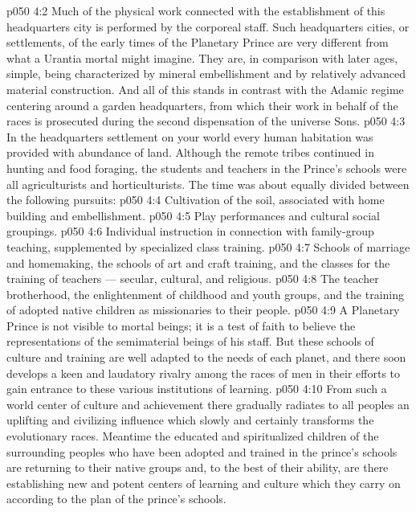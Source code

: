 \vs p050 4:2 Much of the physical work connected with the establishment of this headquarters city is performed by the corporeal staff. Such headquarters cities, or settlements, of the early times of the Planetary Prince are very different from what a Urantia mortal might imagine. They are, in comparison with later ages, simple, being characterized by mineral embellishment and by relatively advanced material construction. And all of this stands in contrast with the Adamic regime centering around a garden headquarters, from which their work in behalf of the races is prosecuted during the second dispensation of the universe Sons.
\vs p050 4:3 \pc In the headquarters settlement on your world every human habitation was provided with abundance of land. Although the remote tribes continued in hunting and food foraging, the students and teachers in the Prince’s schools were all agriculturists and horticulturists. The time was about equally divided between the following pursuits:
\vs p050 4:4 \bibnobreakspace {} Cultivation of the soil, associated with home building and embellishment.
\vs p050 4:5 \bibnobreakspace {} Play performances and cultural social groupings.
\vs p050 4:6 \bibnobreakspace {} Individual instruction in connection with family\hyp{}group teaching, supplemented by specialized class training.
\vs p050 4:7 \bibnobreakspace {} Schools of marriage and homemaking, the schools of art and craft training, and the classes for the training of teachers --- secular, cultural, and religious.
\vs p050 4:8 \bibnobreakspace {} The teacher brotherhood, the enlightenment of childhood and youth groups, and the training of adopted native children as missionaries to their people.
\vs p050 4:9 \pc A Planetary Prince is not visible to mortal beings; it is a test of faith to believe the representations of the semimaterial beings of his staff. But these schools of culture and training are well adapted to the needs of each planet, and there soon develops a keen and laudatory rivalry among the races of men in their efforts to gain entrance to these various institutions of learning.
\vs p050 4:10 From such a world center of culture and achievement there gradually radiates to all peoples an uplifting and civilizing influence which slowly and certainly transforms the evolutionary races. Meantime the educated and spiritualized children of the surrounding peoples who have been adopted and trained in the prince’s schools are returning to their native groups and, to the best of their ability, are there establishing new and potent centers of learning and culture which they carry on according to the plan of the prince’s schools.
